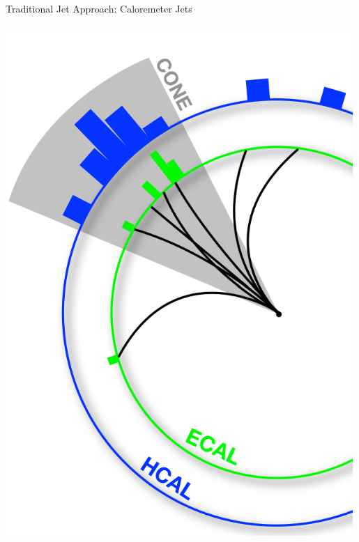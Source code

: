 \begin{frame}{Traditional Jet Approach: Caloremeter Jets}
\begin{columns}[T]
\begin{column}{0.40\textwidth}
    \includegraphics[width=0.99\textwidth]{images/calojets.pdf}
  \end{column}
\end{columns}
\end{frame}


